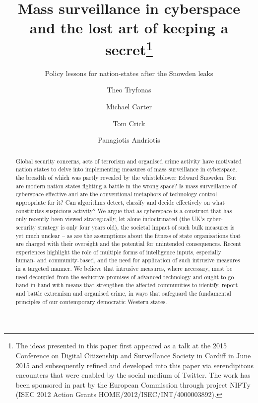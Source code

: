 \documentclass{llncs}
\begin{document}
\title{Mass surveillance in cyberspace and the lost art of keeping a secret\thanks{The ideas presented in this paper first appeared as a talk at the 2015 Conference on Digital Citizenship and Surveillance Society in Cardiff in June 2015 and subsequently refined and developed into this paper via serendipitous encounters that were enabled by the social medium of Twitter. The work has been sponsored in part by the European Commission through project NIFTy (ISEC 2012 Action Grants HOME/2012/ISEC/INT/4000003892).}}
\subtitle{Policy lessons for nation-states after the Snowden leaks}

\author{Theo Tryfonas \and Michael Carter \and Tom Crick \and Panagiotis Andriotis}

\maketitle

\begin{abstract}
Global security concerns, acts of terrorism and organised crime activity have motivated nation states to delve into implementing measures of mass surveillance in cyberspace, the breadth of which was partly revealed by the whistleblower Edward Snowden. But are modern nation states fighting a battle in the wrong space? Is mass surveillance of cyberspace effective and are the conventional metaphors of technology control appropriate for it? Can algorithms detect, classify and decide effectively on what constitutes suspicious activity? We argue that as cyberspace is a construct that has only recently been viewed strategically, let alone indoctrinated (the UK’s cyber-security strategy is only four years old), the societal impact of such bulk measures is yet much unclear -- as are the assumptions about the fitness of state organisations that are charged with their oversight and the potential for unintended consequences. Recent experiences highlight the role of multiple forms of intelligence inputs, especially human- and community-based, and the need for application of such intrusive measures in a targeted manner. We believe that intrusive measures, where necessary, must be used decoupled from the seductive promises of advanced technology and ought to go hand-in-hand with means that strengthen the affected communities to identify, report and battle extremism and organised crime, in ways that safeguard the fundamental principles of our contemporary democratic Western states.
\end{abstract}
\end{document}
